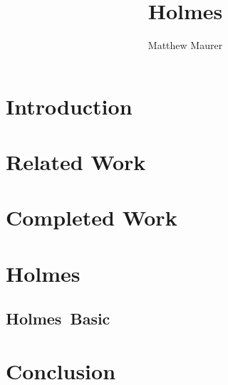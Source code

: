 \documentclass{report}
\begin{document}
\newcommand{\sysname}{Holmes}
\title{\sysname}
\author{Matthew Maurer}
\maketitle
\begin{abstract}

\end{abstract}
\tableofcontents
\chapter{Introduction}

\chapter{Related Work}
\chapter{Completed Work}
\chapter{\sysname}
\section{\sysname\ Basic}
\label{sec:holmes_basic}
\chapter{Conclusion}
\end{document}
